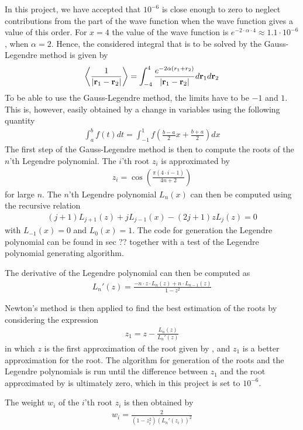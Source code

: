 In this project, we  have accepted that $10^{-6}$ is close enough to zero to neglect contributions from the part of the wave function when the wave function gives a value of this order.
For $x=4$ the value of the wave function is $e^{-2\cdot \alpha \cdot 4} \approx 1.1\cdot 10^{-6}$, when $\alpha = 2$.
Hence, the considered integral that is to be solved by the Gauss-Legendre method is given by
\begin{align}
   \left< \frac{1}{| \mbox{\textbf{r}}_1 - \mbox{\textbf{r}}_2 |} \right> 
   = \int _{-4} ^{4} \frac{e^{-2\alpha (r_1+r_2)}}{| \mbox{\textbf{r}}_1 - \mbox{\textbf{r}}_2 |} d \mbox{\textbf{r}}_1 d\mbox{\textbf{r}}_2
\label{eq:GLdMethod1}
\end{align} 
To be able to use the Gauss-Legendre method, the limits have to be $-1$ and $1$. 
This is, however, easily obtained by a change in variables using the following quantity
\begin{align}
	\int _a ^b f(t) dt = \int _{-1} ^1 f \left( \frac{b-a}{2} x + \frac{b+a}{2} \right) dx
	\label{eq:GLdMethod2}
\end{align} 
The first step of the Gauss-Legendre method is then to compute the roots of the $n$'th Legendre polynomial.
The $i$'th root $z_i$ is approximated by
\begin{align}
	z_i = \cos \left( \frac{\pi (4\cdot i - 1)}{4n+2} \right)
	\label{eq:GLdMethod3}
\end{align} 
for large $n$.
The $n$'th  Legendre polynomial $L_n(x)$ can then be computed using the recursive relation
\begin{align}
	(j+1)L_{j+1} (z) + j L_{j-1} (x) -(2j+1) z L_j (z) = 0
	\label{eq:GLdMethod4}
\end{align} 
with $L_{-1} (x) = 0$ and $L_0 (x) = 1$.
The code for generation the Legendre polynomial can be found in sec ??  together with a test of the Legendre polynomial generating algorithm.

The derivative of the Legendre polynomial can then be computed as
\begin{align}
	L_n '(z) = \frac{-n\cdot z \cdot L_n (z) +n \cdot L_{n-1} (z)}{1-z^2} 
	\label{eq:GLdMethod4a}
\end{align}

Newton's method is then applied to find the best estimation of the roots by considering the expression
\begin{align}
	z_1 = z- \frac{L_n(z)}{L_n'(z)}
	\label{eq:GLdMethod5}
\end{align}
in which $z$ is the first approximation of the root given by , and $z_1$ is a better approximation for the root. 
The algorithm for generation of the roots and the Legendre polynomials is run until the difference between $z_1$ and the root approximated by  is ultimately zero, which in this project is set to $10^{-6}$.

The weight $w_i$ of the $i$'th root $z_i$ is then obtained by
\begin{align}
	w_i = \frac{2}{(1-z_i^2)(L_n'(z_i))^2}
	\label{eq:GLdMethod6}
\end{align}
  

